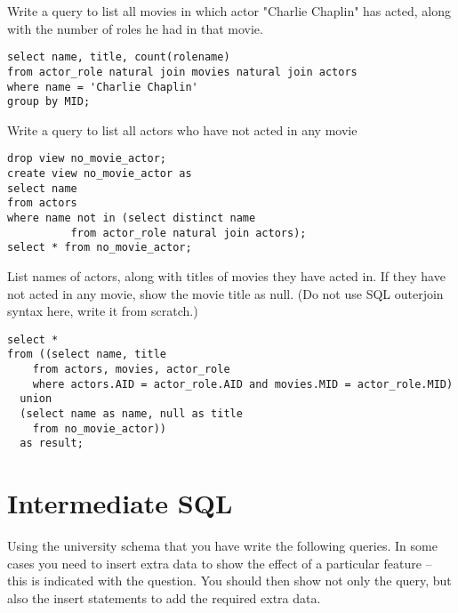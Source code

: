 \documentclass[logo,reportComp]{thesis}
\begin{document}
\begin{question}
\normalfont 
Write a query to list all movies in which actor "Charlie Chaplin" has acted, along with the number of roles he had in that movie.
\end{question}
\begin{answer}\mbox{}\par
\begin{lstlisting}
select name, title, count(rolename)
from actor_role natural join movies natural join actors
where name = 'Charlie Chaplin'
group by MID;
\end{lstlisting}
\end{answer}

\begin{question}
\normalfont 
Write a query to list all actors who have not acted in any movie
\end{question}
\begin{answer}\mbox{}\par
\begin{lstlisting}
drop view no_movie_actor;
create view no_movie_actor as
select name
from actors
where name not in (select distinct name
          from actor_role natural join actors);
select * from no_movie_actor;
\end{lstlisting}
\end{answer}

\begin{question}
\normalfont 
List names of actors, along with titles of movies they have acted in. If they have not acted in any movie, show the movie title as null. (Do not use SQL outerjoin syntax here, write it from scratch.)
\end{question}
\begin{answer}\mbox{}\par
\begin{lstlisting}
select *
from ((select name, title
    from actors, movies, actor_role
    where actors.AID = actor_role.AID and movies.MID = actor_role.MID)
  union
  (select name as name, null as title
    from no_movie_actor))
  as result;
\end{lstlisting}
\end{answer}


\setcounter{question}{0}
\section{Intermediate SQL}
Using the university schema that you have write the following queries. In some cases you need to insert extra data to show the effect of a particular feature -- this is indicated with the question. You should then show not only the query, but also the insert statements to add the required extra data.
\end{document}
